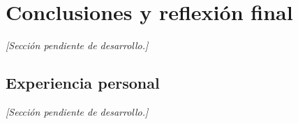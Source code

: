 
\section{Conclusiones y reflexión final}

\textit{[Sección pendiente de desarrollo.]}

\subsection{Experiencia personal}

\textit{[Sección pendiente de desarrollo.]}
